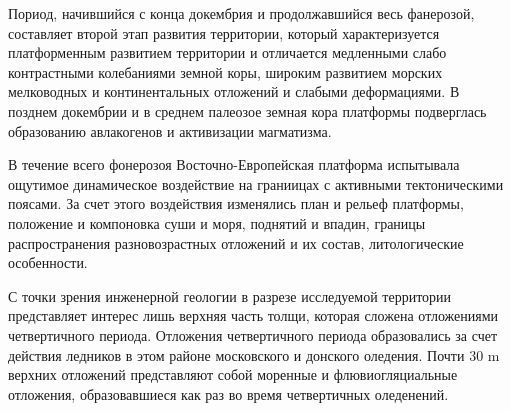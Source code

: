 Пориод, начившийся с конца докембрия и продолжавшийся весь фанерозой, 
составляет второй этап развития 
территории, который характеризуется платформенным развитием территории и отличается 
медленными слабо контрастными колебаниями земной коры, широким развитием морских
мелководных и континентальных отложений и слабыми деформациями. В позднем докембрии 
и в среднем палеозое земная кора платформы подверглась образованию авлакогенов 
и активизации магматизма. 

В течение всего фонерозоя Восточно-Европейская платформа испытывала 
ощутимое динамическое воздействие на граниицах с активными тектоническими
поясами.
За счет этого воздействия изменялись план и рельеф платформы, 
положение и компоновка суши и моря, поднятий и впадин, границы распространения 
разновозрастных отложений и их состав, литологические особенности.

С точки зрения инженерной геологии в разрезе исследуемой территории 
представляет интерес лишь верхняя часть толщи, которая сложена 
отложениями четвертичного периода. Отложения четвертичного периода 
образовались за счет действия ледников в этом районе 
московского и донского оледения. Почти 30 \si{\meter} верхних 
отложений представляют собой моренные и флювиогляциальные отложения, 
образовавшиеся как раз  во время четвертичных оледенений.